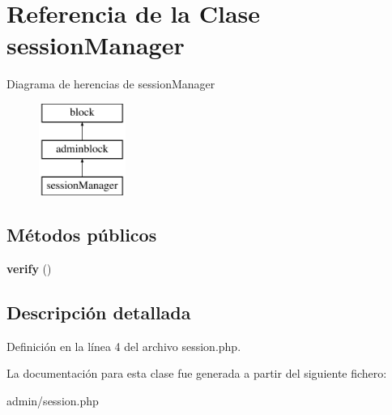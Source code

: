 \hypertarget{classsessionManager}{\section{\-Referencia de la \-Clase session\-Manager}
\label{classsessionManager}
}
\-Diagrama de herencias de session\-Manager\begin{figure}[H]
\begin{center}
\leavevmode
\includegraphics[height=3.000000cm]{classsessionManager}
\end{center}
\end{figure}
\subsection*{\-Métodos públicos}
\begin{DoxyCompactItemize}
\item 
\hypertarget{classsessionManager_a341e75413ef5e07e6d59f49e7b1845db}{{\bfseries verify} ()}\label{classsessionManager_a341e75413ef5e07e6d59f49e7b1845db}

\end{DoxyCompactItemize}


\subsection{\-Descripción detallada}


\-Definición en la línea 4 del archivo session.\-php.



\-La documentación para esta clase fue generada a partir del siguiente fichero\-:\begin{DoxyCompactItemize}
\item 
admin/session.\-php\end{DoxyCompactItemize}
